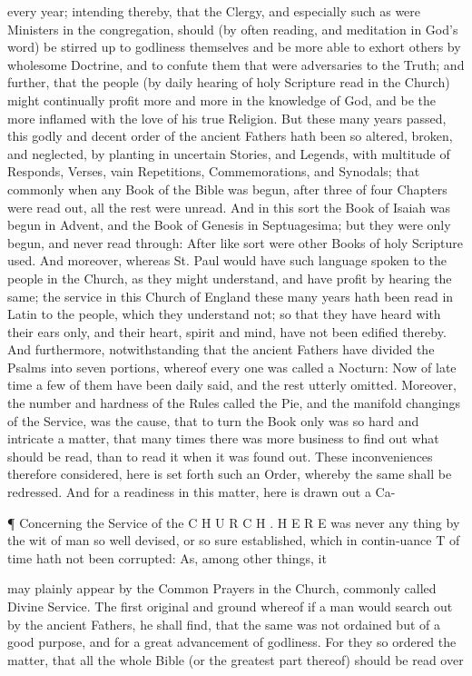 every year; intending thereby, that the Clergy, and especially such as were Ministers in the congregation, should (by often reading, and meditation in God’s word) be stirred up to godliness themselves and be more able to exhort others by wholesome Doctrine, and to confute them that were adversaries to the Truth; and further, that the people (by daily hearing of holy Scripture read in the Church) might continually profit more and more in the knowledge of God, and be the more inflamed with the love of his true Religion. But these many years passed, this godly and decent order of the ancient Fathers hath been so altered, broken, and neglected, by planting in uncertain Stories, and Legends, with multitude of Responds, Verses, vain Repetitions, Commemorations, and Synodals; that commonly when any Book of the Bible was begun, after three of four Chapters were read out, all the rest were unread. And in this sort the Book of Isaiah was begun in Advent, and the Book of Genesis in Septuagesima; but they were only begun, and never read through: After like sort were other Books of holy Scripture used. And moreover, whereas St. Paul would have such language spoken to the people in the Church, as they might understand, and have profit by hearing the same; the service in this Church of England these many years hath been read in Latin to the people, which they understand not; so that they have heard with their ears only, and their heart, spirit and mind, have not been edified thereby. And furthermore, notwithstanding that the ancient Fathers have divided the Psalms into seven portions, whereof every one was called a Nocturn: Now of late time a few of them have been daily said, and the rest utterly omitted. Moreover, the number and hardness of the Rules called the Pie, and the manifold changings of the Service, was the cause, that to turn the Book only was so hard and intricate a matter, that many times there was more business to find out what should be read, than to read it when it was found out. These inconveniences therefore considered, here is set forth such an Order, whereby the same shall be redressed. And for a readiness in this matter, here is drawn out a Ca-

¶ Concerning the Service of the C H U R C H . H E R E was never any thing by the wit of man so well devised, or so sure established, which in contin-uance T of time hath not been corrupted: As, among other things, it

may plainly appear by the Common Prayers in the Church, commonly called Divine Service. The first original and ground whereof if a man would search out by the ancient Fathers, he shall find, that the same was not ordained but of a good purpose, and for a great advancement of godliness. For they so ordered the matter, that all the whole Bible (or the greatest part thereof) should be read over

